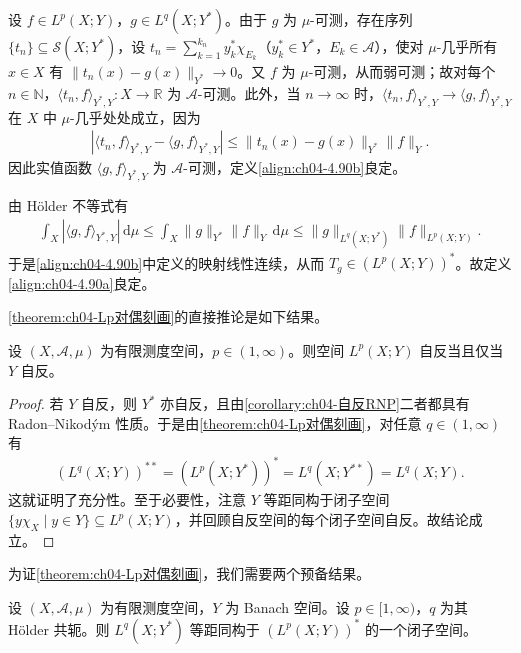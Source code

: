 \documentclass[../../main.tex]{subfiles}%
\begin{document}
\begin{remark}\label{remark:ch04-对偶配对良定}
设 $f\in L^p(X;Y)$，$g\in L^q(X;Y^*)$。由于 $g$ 为 $\mu$-可测，存在序列 $\{t_n\}\subseteq\mathcal{S}(X;Y^*)$，设 $t_n=\sum_{k=1}^{k_n}y_k^*\chi_{E_k}$（$y_k^*\in Y^*$，$E_k\in\mathcal{A}$），使对 $\mu$-几乎所有 $x\in X$ 有 $\|t_n(x)-g(x)\|_{Y^*}\to0$。又 $f$ 为 $\mu$-可测，从而弱可测；故对每个 $n\in\mathbb{N}$，$\langle t_n,f\rangle_{Y^*,Y}:X\to\mathbb{R}$ 为 $\mathcal{A}$-可测。此外，当 $n\to\infty$ 时，$\langle t_n,f\rangle_{Y^*,Y}\to\langle g,f\rangle_{Y^*,Y}$ 在 $X$ 中 $\mu$-几乎处处成立，因为
\begin{align*}
|\langle t_n,f\rangle_{Y^*,Y}-\langle g,f\rangle_{Y^*,Y}|\leqslant\|t_n(x)-g(x)\|_{Y^*}\|f\|_Y.
\end{align*}
因此实值函数 $\langle g,f\rangle_{Y^*,Y}$ 为 $\mathcal{A}$-可测，定义\eqref{align:ch04-4.90b}良定。

由 Hölder 不等式有
\begin{align}
\int_X|\langle g,f\rangle_{Y^*,Y}|\,\mathrm{d}\mu\leqslant\int_X\|g\|_{Y^*}\|f\|_Y\,\mathrm{d}\mu\leqslant\|g\|_{L^q(X;Y^*)}\|f\|_{L^p(X;Y)}. \label{align:ch04-4.91}
\end{align}
于是\eqref{align:ch04-4.90b}中定义的映射线性连续，从而 $T_g\in(L^p(X;Y))^*$。故定义\eqref{align:ch04-4.90a}良定。
\end{remark}

\cref{theorem:ch04-Lp对偶刻画}的直接推论是如下结果。

\begin{proposition}\label{proposition:ch04-Lp自反}
设 $(X,\mathcal{A},\mu)$ 为有限测度空间，$p\in(1,\infty)$。则空间 $L^p(X;Y)$ 自反当且仅当 $Y$ 自反。
\end{proposition}

\begin{proof}
若 $Y$ 自反，则 $Y^*$ 亦自反，且由\cref{corollary:ch04-自反RNP}二者都具有 Radon--Nikodým 性质。于是由\cref{theorem:ch04-Lp对偶刻画}，对任意 $q\in(1,\infty)$ 有
\begin{align*}
(L^q(X;Y))^{**}=(L^p(X;Y^*))^*=L^q(X;Y^{**})=L^q(X;Y).
\end{align*}
这就证明了充分性。至于必要性，注意 $Y$ 等距同构于闭子空间 $\{y\chi_X\mid y\in Y\}\subseteq L^p(X;Y)$，并回顾自反空间的每个闭子空间自反。故结论成立。
\end{proof}

为证\cref{theorem:ch04-Lp对偶刻画}，我们需要两个预备结果。

\begin{proposition}\label{proposition:ch04-对偶等距嵌入}
设 $(X,\mathcal{A},\mu)$ 为有限测度空间，$Y$ 为 Banach 空间。设 $p\in[1,\infty)$，$q$ 为其 Hölder 共轭。则 $L^q(X;Y^*)$ 等距同构于 $(L^p(X;Y))^*$ 的一个闭子空间。
\end{proposition}
\end{document}
